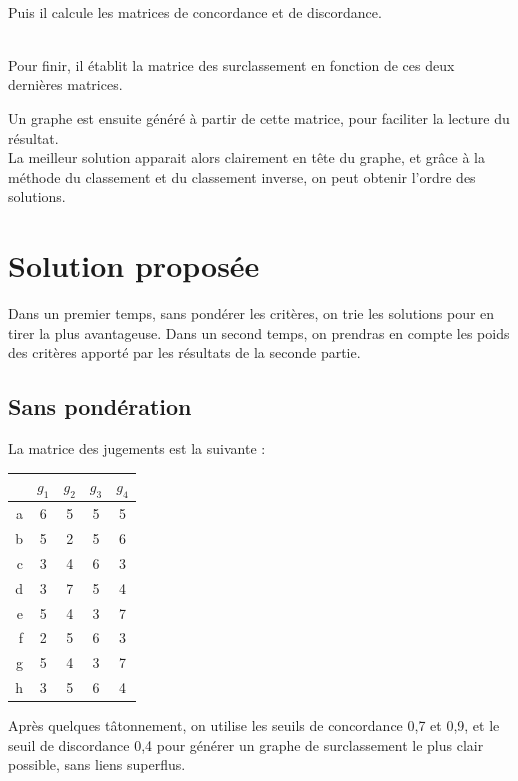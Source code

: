 ~\\
Puis il calcule les matrices de concordance et de discordance.

~\\
Pour finir, il établit la matrice des surclassement en fonction de ces deux dernières matrices.


Un graphe est ensuite généré à partir de cette matrice, pour faciliter la lecture du résultat.\\
La meilleur solution apparait alors clairement en tête du graphe, et grâce à la méthode du classement et du classement inverse, on peut obtenir l'ordre des solutions.

\section{Solution proposée}

Dans un premier temps, sans pondérer les critères, on trie les solutions pour en tirer la plus avantageuse. Dans un second temps, on prendras en compte les poids des critères apporté par les résultats de la seconde partie.

\subsection{Sans pondération}

La matrice des jugements est la suivante :
\begin{center}
\begin{tabular}{r | c c c c}
~ & $g_1$ & $g_2$ & $g_3$ & $g_4$ \\ \hline
a & 6 & 5 & 5 & 5 \\
b & 5 & 2 & 5 & 6 \\
c & 3 & 4 & 6 & 3 \\
d & 3 & 7 & 5 & 4 \\
e & 5 & 4 & 3 & 7 \\
f & 2 & 5 & 6 & 3 \\
g & 5 & 4 & 3 & 7 \\
h & 3 & 5 & 6 & 4 \\
\end{tabular}
\end{center}

Après quelques tâtonnement, on utilise les seuils de concordance 0,7 et 0,9, et le seuil de discordance 0,4 pour générer un graphe de surclassement le plus clair possible, sans liens superflus.

